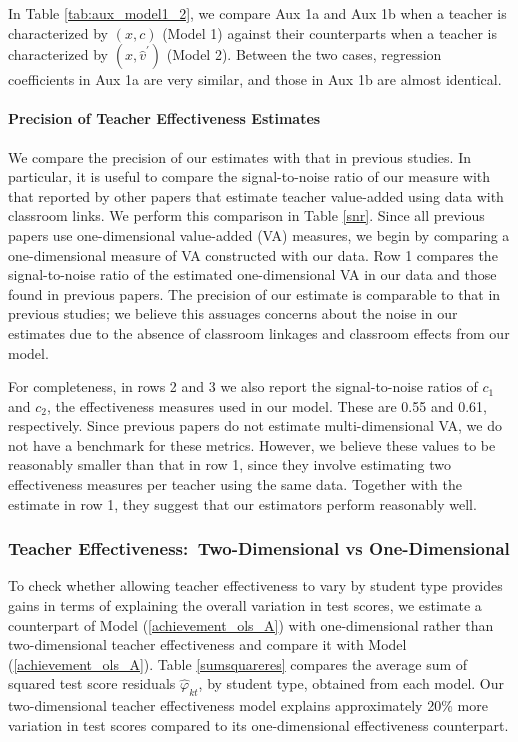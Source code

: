 \documentclass[notitlepage,12pt]{article}%
\begin{document}
In Table \ref{tab:aux_model1_2}, we compare Aux 1a and Aux 1b when a teacher
is characterized by $\left(  x,c\right)  $ (Model 1) against their
counterparts when a teacher is characterized by $\left(  x,\hat{v}^{\prime
}\right)  $ (Model 2). Between the two cases, regression coefficients in Aux
1a are very similar, and those in Aux 1b are almost identical.

\paragraph{Precision of Teacher Effectiveness Estimates}

We compare the precision of our estimates with that in previous studies. In
particular, it is useful to compare the signal-to-noise ratio of our measure
with that reported by other papers that estimate teacher value-added using
data with classroom links. We perform this comparison in Table \ref{snr}.
Since all previous papers use one-dimensional value-added (VA) measures, we
begin by comparing a one-dimensional measure of VA constructed with our data.
Row 1 compares the signal-to-noise ratio of the estimated one-dimensional VA
in our data and those found in previous papers. The precision of our estimate
is comparable to that in previous studies; we believe this assuages concerns
about the noise in our estimates due to the absence of classroom linkages and
classroom effects from our model.

For completeness, in rows 2 and 3 we also report the signal-to-noise ratios of
$c_{1}$and $c_{2}$, the effectiveness measures used in our model. These are
0.55 and 0.61, respectively. Since previous papers do not estimate
multi-dimensional VA, we do not have a benchmark for these metrics. However,
we believe these values to be reasonably smaller than that in row 1, since
they involve estimating two effectiveness measures per teacher using the same
data. Together with the estimate in row 1, they suggest that our estimators
perform reasonably well.

\subsubsection{Teacher Effectiveness:\ Two-Dimensional vs One-Dimensional}

To check whether allowing teacher effectiveness to vary by student type
provides gains in terms of explaining the overall variation in test scores, we
estimate a counterpart of Model (\ref{achievement_ols_A}) with one-dimensional
rather than two-dimensional teacher effectiveness and compare it with Model
(\ref{achievement_ols_A}). Table \ref{sumsquareres} compares the average sum
of squared test score residuals $\hat{\varphi}_{kt}$, by student type,
obtained from each model. Our two-dimensional teacher effectiveness model
explains approximately 20\% more variation in test scores compared to its
one-dimensional effectiveness counterpart.
\end{document}
